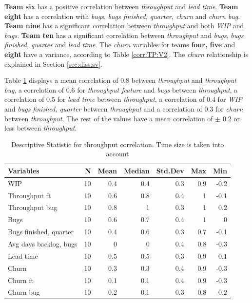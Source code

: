 \documentclass[UKenglish]{ifimaster}  %
\begin{document}
 
\textbf{Team six} has a positive correlation  between \textit{throughput} and \textit{lead time}. \textbf{Team eight} has a correlation  with \textit{bugs}, \textit{bugs finished, quarter, churn} and \textit{churn bug}. \textbf{Team nine} has a  significant correlation  between \textit{throughput} and both \textit{WIP} and \textit{bugs}. \textbf{Team ten} has a significant correlation between \textit{throughput} and \textit{bugs}, \textit{bugs finished, quarter} and \textit{lead time}. 
The \textit{churn} variables for teams \textbf{four, five} and \textbf{eight} have a variance, according to Table \ref{corr:TP:V2}. The \textit{churn} relationship is explained in Section \ref{sec:diss:sv}. 

Table \ref{DS:corr:TP:v2} displays a mean correlation of 0.8 between \textit{throughput} and \textit{throughput bug}, a correlation of 0.6 for \textit{throughput feature} and \textit{bugs} between \textit{throughput}, a correlation of 0.5 for \textit{lead time} between \textit{throughput}, a correlation of 0.4 for \textit{WIP} and \textit{bugs finished, quarter} between \textit{throughput} and a correlation of 0.3 for \textit{churn} between \textit{throughput}. The rest of the values have a mean correlation of $\pm$ 0.2 or less between \textit{throughput}. 
 
\begin{table}[!htbp]
 \caption{Descriptive Statistic for throughput correlation. Time size is taken into account}
 \centering
 \begin{tabular}{ | l | r | r | r | r | r | r | }
 \hline
\textbf{Variables}& \bf{N} & \bf{Mean} & \bf{Median} & \bf{Std.Dev} & \bf{Max} & \bf{Min} \\ \hline
WIP  & 10 & 0.4 & 0.4 & 0.3 & 0.9 & -0.2\\ \hline
Throughput ft  & 10 & 0.6 & 0.8 & 0.4 & 1 & -0.1\\ \hline
Throughput bug  & 10 & 0.8 & 1 & 0.3 & 1 & 0.2\\ \hline
Bugs  & 10 & 0.6 & 0.7 & 0.4 & 1 & 0\\ \hline
Bugs finished, quarter  & 10 & 0.4 & 0.6 & 0.3 & 0.7 & -0.1\\ \hline
Avg days backlog, bugs  & 10 & 0 & 0 & 0.4 & 0.8 & -0.3\\ \hline
Lead time & 10 & 0.5 & 0.5 & 0.3 & 0.9 & 0.1\\ \hline
Churn  & 10 & 0.3 & 0.3 & 0.4 & 0.9 & -0.3\\ \hline
Churn ft  & 10 & 0.1 & 0.1 & 0.4 & 0.9 & -0.3\\ \hline
Churn bug  & 10 & 0.2 & 0.1 & 0.3 & 0.8 & -0.2\\ \hline
\end{tabular}
 \label{DS:corr:TP:v2}
 \end{table}
 
\end{document}
